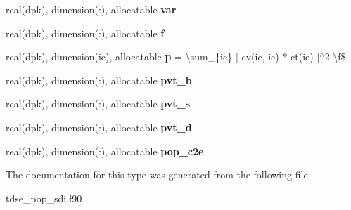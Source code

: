 \begin{DoxyCompactItemize}
\item 
real(dpk), dimension(\+:), allocatable {\bfseries var}\hypertarget{structatom__2e_1_1symmetry__ls2e_aa93659f75c7f38e510a633bd03806d28}{}\label{structatom__2e_1_1symmetry__ls2e_aa93659f75c7f38e510a633bd03806d28}

\item 
real(dpk), dimension(\+:), allocatable {\bfseries f}\hypertarget{structatom__2e_1_1symmetry__ls2e_a90e786acb2d19e0c6b4cb3725369e7ac}{}\label{structatom__2e_1_1symmetry__ls2e_a90e786acb2d19e0c6b4cb3725369e7ac}

\item 
real(dpk), dimension(ic), allocatable {\bfseries p} = \textbackslash{}sum\+\_\+\{ie\} $\vert$ cv(ie, ic) $\ast$ ct(ie) $\vert$$^\wedge$2 \textbackslash{}f\$\hypertarget{structatom__2e_1_1symmetry__ls2e_afbd45d84f61fa8513ebbb678c08d3854}{}\label{structatom__2e_1_1symmetry__ls2e_afbd45d84f61fa8513ebbb678c08d3854}

\item 
real(dpk), dimension(\+:), allocatable {\bfseries pvt\+\_\+b}\hypertarget{structatom__2e_1_1symmetry__ls2e_ac0525b000e9f6e95268a81907d936e64}{}\label{structatom__2e_1_1symmetry__ls2e_ac0525b000e9f6e95268a81907d936e64}

\item 
real(dpk), dimension(\+:), allocatable {\bfseries pvt\+\_\+s}\hypertarget{structatom__2e_1_1symmetry__ls2e_ab929b7ff91cdc563339d6e5895062e08}{}\label{structatom__2e_1_1symmetry__ls2e_ab929b7ff91cdc563339d6e5895062e08}

\item 
real(dpk), dimension(\+:), allocatable {\bfseries pvt\+\_\+d}\hypertarget{structatom__2e_1_1symmetry__ls2e_a8c3f948325c26e3c42820f22f68c0a19}{}\label{structatom__2e_1_1symmetry__ls2e_a8c3f948325c26e3c42820f22f68c0a19}

\item 
real(dpk), dimension(\+:), allocatable {\bfseries pop\+\_\+c2e}\hypertarget{structatom__2e_1_1symmetry__ls2e_a5c5d65901e1fc29077c25560f7302684}{}\label{structatom__2e_1_1symmetry__ls2e_a5c5d65901e1fc29077c25560f7302684}

\end{DoxyCompactItemize}


The documentation for this type was generated from the following file\+:\begin{DoxyCompactItemize}
\item 
tdse\+\_\+pop\+\_\+sdi.\+f90\end{DoxyCompactItemize}

